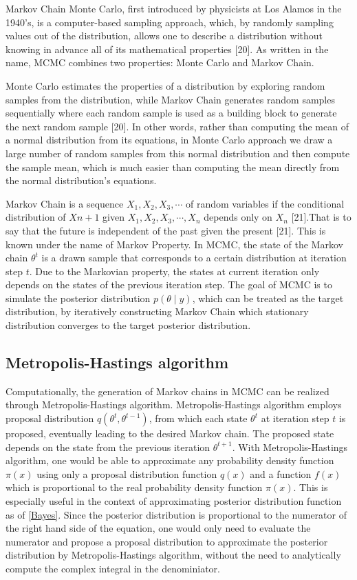 \documentclass{usiinftr}
\begin{document}
Markov Chain Monte Carlo, first introduced by physicists at Los Alamos in the 1940's, is a computer-based sampling approach, which, by randomly sampling values out of the distribution, allows one to describe a distribution without knowing in advance all of its mathematical properties [20]. As written in the name, MCMC combines two properties: Monte Carlo and Markov Chain. 

Monte Carlo estimates the properties of a distribution by exploring random samples from the distribution, while Markov Chain generates random samples sequentially where each random sample is used as a building block to generate the next random sample [20]. In other words, rather than computing the mean of a normal distribution from its equations, in Monte Carlo approach we draw a large number of random samples from this normal distribution and then compute the sample mean, which is much easier than computing the mean directly from the normal distribution's equations.

Markov Chain is a sequence $X_1,X_2, X_3, \cdots$ of random variables if the conditional distribution of $X{n+1}$ given $X_1,X_2, X_3, \cdots, X_n$ depends only on $X_n$ [21].That is to say that the future is independent of the past given the present [21]. This is known under the name of Markov Property. In MCMC, the state of the Markov chain $\theta^{t}$ is a drawn sample that corresponds to a certain distribution at iteration step $t$. Due to the Markovian property, the states at current iteration only depends on the states of the previous iteration step. The goal of MCMC is to simulate the posterior distribution $p(\theta \mid y)$, which can be treated as the target distribution, by iteratively constructing Markov Chain which stationary distribution converges to the target posterior distribution. 


\subsection{Metropolis-Hastings algorithm}
Computationally, the generation of Markov chains in MCMC can be realized through Metropolis-Hastings algorithm. Metropolis-Hastings algorithm employs proposal distribution $q(\theta^{t},\theta^{t-1})$, from which each state $\theta^{t}$ at iteration step $t$ is proposed, eventually leading to the desired Markov chain. The proposed state depends on the state from the previous iteration $\theta^{t+1}$. With Metropolis-Hastings algorithm, one would be able to approximate any probability density function $\pi(x)$ using only a proposal distribution function $q(x)$ and a function $f(x)$ which is proportional to the real probability density function $\pi(x)$.  This is especially useful in the context of approximating posterior distribution function as of \ref{Bayes}. Since the posterior distribution is proportional to the numerator of the right hand side of the equation, one would only need to evaluate the numerator and propose a proposal distribution to approximate the posterior distribution by Metropolis-Hastings algorithm, without the need to analytically compute the complex integral in the denominiator.
\end{document}
